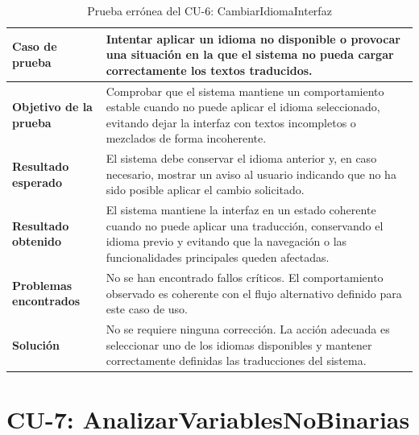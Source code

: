 \begin{table}[H]
\centering
\small
\begin{tabularx}{\textwidth}{|p{}|X|}
\hline
\textbf{Caso de prueba} & Intentar aplicar un idioma no disponible o provocar una situación en la que el sistema no pueda cargar correctamente los textos traducidos. \\ \hline
\textbf{Objetivo de la prueba} & Comprobar que el sistema mantiene un comportamiento estable cuando no puede aplicar el idioma seleccionado, evitando dejar la interfaz con textos incompletos o mezclados de forma incoherente. \\ \hline
\textbf{Resultado esperado} & El sistema debe conservar el idioma anterior y, en caso necesario, mostrar un aviso al usuario indicando que no ha sido posible aplicar el cambio solicitado. \\ \hline
\textbf{Resultado obtenido} & El sistema mantiene la interfaz en un estado coherente cuando no puede aplicar una traducción, conservando el idioma previo y evitando que la navegación o las funcionalidades principales queden afectadas. \\ \hline
\textbf{Problemas encontrados} & No se han encontrado fallos críticos. El comportamiento observado es coherente con el flujo alternativo definido para este caso de uso. \\ \hline
\textbf{Solución} & No se requiere ninguna corrección. La acción adecuada es seleccionar uno de los idiomas disponibles y mantener correctamente definidas las traducciones del sistema. \\ \hline
\end{tabularx}
\caption{Prueba errónea del CU-6: CambiarIdiomaInterfaz}
\label{tab:prueba_erronea_cu6}
\normalsize
\end{table}

\Needspace{0.80\textheight}
\section{CU-7: AnalizarVariablesNoBinarias}


